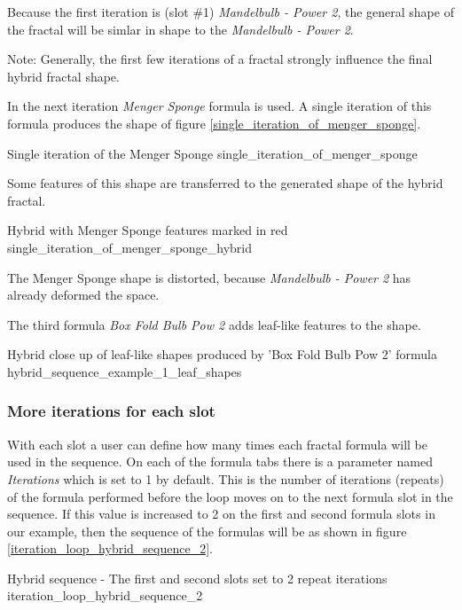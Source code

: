 Because the first iteration is (slot \#1) \emph{Mandelbulb - Power 2}, the general shape
of the fractal will be simlar in shape to the \emph{Mandelbulb - Power 2}.

Note: Generally, the first few iterations of a fractal strongly influence the final hybrid fractal shape.

In the next iteration \emph{Menger Sponge} formula is used. A single iteration
of this formula produces the shape of figure \ref{single_iteration_of_menger_sponge}.

{Single iteration of the Menger Sponge}
{single_iteration_of_menger_sponge}

Some features of this shape are transferred to the generated shape of the hybrid fractal.

{Hybrid with Menger Sponge features marked in red}
{single_iteration_of_menger_sponge_hybrid}

The Menger Sponge shape is distorted, because \emph{Mandelbulb - Power 2} has
already deformed the space.

The third formula \emph{Box Fold Bulb Pow 2} adds leaf-like features to the shape.

{Hybrid close up of leaf-like shapes produced by 'Box Fold Bulb Pow 2' formula}
{hybrid_sequence_example_1_leaf_shapes}

\subsubsection{More iterations for each slot}

With each slot a user can define how many times each fractal formula will be used in the sequence.
On each of the formula tabs there is a parameter named \emph{Iterations} which is set to 1 by default.
This is the number of iterations (repeats) of the formula performed before the loop moves on to the next formula slot in the sequence.
If this value is increased to 2 on the first and second formula slots in our example,
then the sequence of the formulas will be as shown in figure \ref{iteration_loop_hybrid_sequence_2}. \label{two-iterations-per-slot}

{Hybrid sequence - The first and second slots set to 2 repeat iterations}
{iteration_loop_hybrid_sequence_2}

